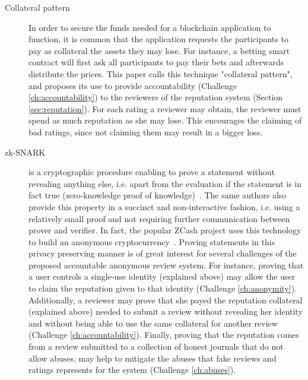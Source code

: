 \begin{description}
\item[Collateral pattern] In order to secure the funds needed for a blockchain
  application to function, it is common that the application requests the
  participants to pay as collateral the assets they may lose. For instance, a
  betting smart contract will first ask all participants to pay their bets and
  afterwards distribute the prices. This paper calls this technique "collateral
  pattern", and proposes its use to provide accountability (Challenge
  \ref{ch:accountability}) to the reviewers of the reputation system (Section
  \ref{sec:reputation}). For each rating a reviewer may obtain, the reviewer
  must spend as much reputation as she may lose. This encourages the claiming of
  bad ratings, since not claiming them may result in a bigger loss.

\item[zk-SNARK] is a cryptographic procedure enabling to prove a statement
  without revealing anything else, i.e. apart from the evaluation if the
  statement is in fact true (zero-knowledge proof of
  knowledge)~\cite{blum1988non,bitansky2013succinct}. The same authors also
  provide this property in a succinct and non-interactive fashion, i.e. using a
  relatively small proof and not requiring further communication between prover
  and verifier. In fact, the popular ZCash project uses this technology to build
  an anonymous cryptocurrency~\cite{sasson2014zerocash}. Proving statements in
  this privacy preserving manner is of great interest for several challenges of
  the proposed accountable anonymous review system. For instance, proving that a
  user controls a single-use identity (explained above) may allow the user to
  claim the reputation given to that identity (Challenge \ref{ch:anonymity}).
  Additionally, a reviewer may prove that she payed the reputation collateral
  (explained above) needed to submit a review without revealing her identity and
  without being able to use the same collateral for another review (Challenge
  \ref{ch:accountability}). Finally, proving that the reputation comes from a
  review submitted to a collection of honest journals that do not allow abuses,
  may help to mitigate the abuses that fake reviews and ratings represents for
  the system (Challenge \ref{ch:abuses}).



\end{description}
